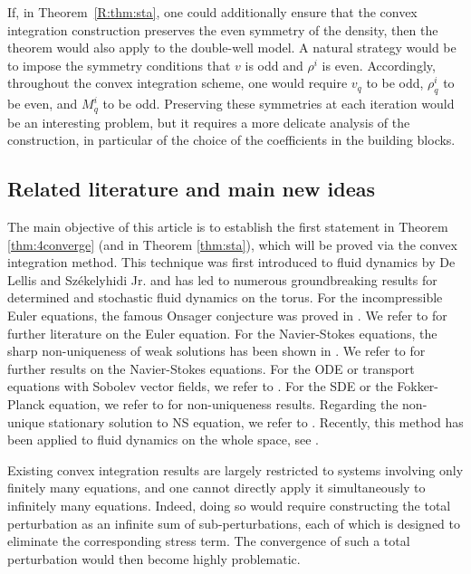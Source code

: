 \documentclass[UTF-8,reqno]{amsart}
\numberwithin{equation}{section}
\theoremstyle{definition}
\begin{document}
If, in Theorem~\ref{R:thm:sta}, one could additionally ensure that the convex
integration construction preserves the even symmetry of the density, then the
theorem would also apply to the  double-well
model. A natural strategy would be to impose the symmetry conditions that
$v$ is odd and $\rho^i$ is even. Accordingly, throughout the convex integration
scheme, one would require
$
v_q$  to be odd,
$\rho_q^i$  to be even, and
$M_q^i$ to be odd.
Preserving these symmetries at each iteration would be an interesting problem,
but it requires a more delicate analysis of the construction, in particular of
the choice of the coefficients in the building blocks.
 

\subsection{Related literature and main new ideas}

The main objective of this article is to establish the first statement in Theorem \ref{thm:4converge} (and in Theorem \ref{thm:sta}), which will be proved via the convex integration method.  
This technique was first introduced to fluid dynamics by De Lellis and Sz\'ekelyhidi Jr. \cite{DLS09, DLS10, DLS13} and  has  led to numerous groundbreaking results for determined and stochastic fluid dynamics on the torus. For the incompressible Euler equations, the famous Onsager conjecture was proved in \cite{Ise18,BDLSV19}. We refer to \cite{TCP,DSJ17,BFH20,NV23,GKN23,GR24} for further literature on the Euler equation. For the Navier-Stokes equations, the sharp non-uniqueness of weak solutions has been shown in \cite{BVb,BCV18,CL22,CL23}.  We refer to \cite{BV,HZZ21b,HZZ19,HZZ22,LZ23b,LZ24} for further results on the Navier-Stokes equations.   
For the ODE or transport equations with Sobolev vector fields, we refer to \cite{CGSW15,MS18,MS19,MS20,BCDL21,CL21,PS23}. 
For the SDE or the Fokker-Planck equation, we refer to \cite{LRZ25,LR25} for non-uniqueness results.  Regarding the non-unique stationary solution to NS equation, we refer to \cite{Luo19}.   Recently, this method has been applied to fluid dynamics on the whole space, see \cite{MNY24a,MNY24b,LR25}.

 

 Existing convex integration results are largely restricted to systems involving
only finitely many equations, and  one cannot directly apply it 
simultaneously to infinitely many equations. Indeed, doing so would require
constructing the total perturbation as an infinite sum of sub-perturbations,
each of which is designed to eliminate the corresponding stress term. The
convergence of such a total perturbation would then become highly problematic.
\end{document}
